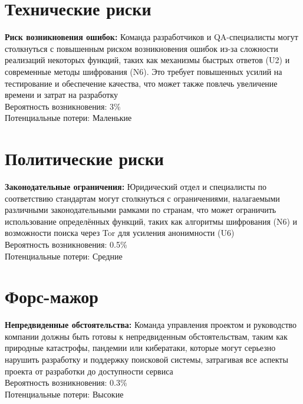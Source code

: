 \documentclass[12pt,a4paper]{article}
\begin{document}
\section{Технические риски}
\textbf{Риск возникновения ошибок:} Команда разработчиков и QA-специалисты могут столкнуться с повышенным риском возникновения ошибок из-за сложности реализаций некоторых функций, таких как механизмы быстрых ответов (U2) и современные методы шифрования (N6). Это требует повышенных усилий на тестирование и обеспечение качества, что может также повлечь увеличение времени и затрат на разработку
\\ \hfill\break
Вероятность возникновения: 3\% \\
Потенциальные потери: Маленькие

\section{Политические риски}
\textbf{Законодательные ограничения:} Юридический отдел и специалисты по соответствию стандартам могут столкнуться с ограничениями, налагаемыми различными законодательными рамками по странам, что может ограничить использование определённых функций, таких как алгоритмы шифрования (N6) и возможности поиска через Tor для усиления анонимности (U6)
\\ \hfill\break
Вероятность возникновения: 0.5\% \\
Потенциальные потери: Средние

\section{Форс-мажор}
\textbf{Непредвиденные обстоятельства:} Команда управления проектом и руководство компании должны быть готовы к непредвиденным обстоятельствам, таким как природные катастрофы, пандемии или кибератаки, которые могут серьезно нарушить разработку и поддержку поисковой системы, затрагивая все аспекты проекта от разработки до доступности сервиса
\\ \hfill\break
Вероятность возникновения: 0.3\% \\
Потенциальные потери: Высокие
\end{document}
